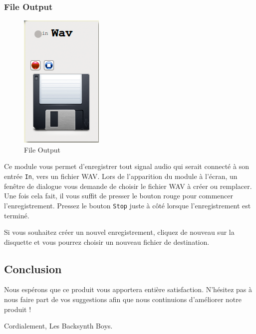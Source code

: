\documentclass[a4paper,oneside,frenchb,12pt]{article}
\begin{document}
\subsubsection{File Output}

\begin{figure}[h!]
\centering
\includegraphics[scale=0.5]{../img/png/wavrecorder.png}
\caption{File Output}
\end{figure}

Ce module vous permet d'enregistrer tout signal audio qui serait
connecté à son entrée \verb!In!, vers un fichier WAV. Lors de
l'apparition du module à l'écran, un fenêtre de dialogue vous demande de
choisir le fichier WAV à créer ou remplacer. Une fois cela fait, il vous
suffit de presser le bouton rouge pour commencer l'enregistrement.
Pressez le bouton \verb!Stop! juste à côté lorsque l'enregistrement est
terminé.

Si vous souhaitez créer un nouvel enregistrement, cliquez de nouveau sur
la disquette et vous pourrez choisir un nouveau fichier de destination.

\subsection{Conclusion}

Nous espérons que ce produit vous apportera entière satisfaction.
N'hésitez pas à nous faire part de vos suggestions afin que nous
continuions d'améliorer notre produit !

Cordialement, Les Backsynth Boys.
\end{document}
